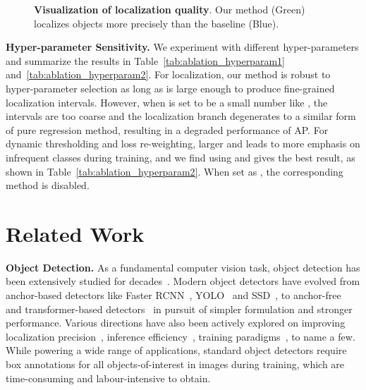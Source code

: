 \documentclass[letterpaper]{article} \usepackage{aaai22}  \usepackage{times}  \usepackage{helvet}  \usepackage{courier}  \usepackage[hyphens]{url}  \usepackage{graphicx} \urlstyle{rm} \def\UrlFont{\rm}  \usepackage{natbib}  \usepackage{caption} \DeclareCaptionStyle{ruled}{labelfont=normalfont,labelsep=colon,strut=off} \frenchspacing  \setlength{\pdfpagewidth}{8.5in}  \setlength{\pdfpageheight}{11in}  \usepackage{algorithm}
\begin{document}
\begin{figure*}[t] \centering
  \caption{\textbf{Visualization of localization quality}. Our method (Green) localizes objects more precisely than the baseline (Blue).}
  \label{fig:vis}
\end{figure*}

\noindent\textbf{Hyper-parameter Sensitivity.} We experiment with different hyper-parameters and summarize the results in Table~\ref{tab:ablation_hyperparam1} and~\ref{tab:ablation_hyperparam2}. For localization, our method is robust to hyper-parameter selection as long as  is large enough to produce fine-grained localization intervals. However, when  is set to be a small number like , the intervals are too coarse and the localization branch degenerates to a similar form of pure regression method, resulting in a degraded performance of  AP. For dynamic thresholding and loss re-weighting, larger  and  leads to more emphasis on infrequent classes during training, and we find using  and  gives the best result, as shown in Table~\ref{tab:ablation_hyperparam2}. When set as , the corresponding method is disabled. 


\section{Related Work}

\noindent\textbf{Object Detection.} As a fundamental computer vision task, object detection has been extensively studied for  decades~\cite{viola,dpn,faster,yolo,detr}. Modern object detectors have evolved from anchor-based detectors like Faster RCNN~\citeyearpar{faster}, YOLO~\citeyearpar{yolo} and SSD~\citeyearpar{ssd}, to anchor-free~\cite{fcos,centernetzhou} and transformer-based detectors~\cite{detr} in pursuit of simpler formulation and stronger performance. Various directions have also been actively explored on improving localization precision~\cite{iounet,wang2020side,qiu2020offset}, inference efficiency~\cite{najibi2019autofocus,uzkent2020efficient}, training paradigms~\cite{atss,freeanchor,noisyanchor}, to name a few. While powering a wide range of applications, standard object detectors require box annotations for all objects-of-interest in images during training, which are time-consuming and labour-intensive to obtain. 
\end{document}
